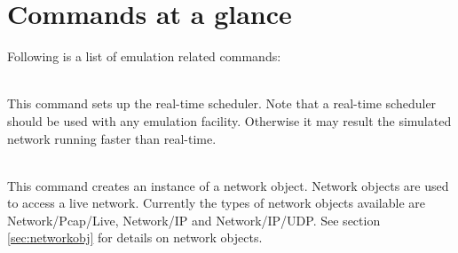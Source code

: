 \section{Commands at a glance}
\label{sec:emulationcommand}

Following is a list of emulation related commands:
\begin{flushleft}
\\
This command sets up the real-time scheduler. Note that a real-time scheduler
should be used with any emulation facility. Otherwise it may result the simulated network
running faster than real-time.

\\
This command creates an instance of a network object. Network objects are used
to access a live network. Currently the types of network objects  available
are Network/Pcap/Live, Network/IP and Network/IP/UDP. See section
\ref{sec:networkobj} for details on network objects.

\end{flushleft}

\endinput
